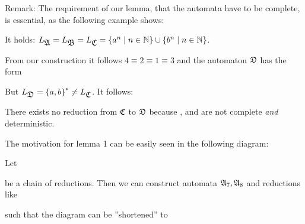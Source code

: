 Remark: The requirement of our lemma, that the automata have to be complete, is
essential, as the following example shows:

\begin{center}

\end{center}

It holds: $L_{\mbox{$\mathfrak{A}$}} = L_{\mbox{$\mathfrak{B}$}} = L_{\mbox{$\mathfrak{C}$}} = \mbox{$\{a^n \mid n \in \mathbb{N}\}$}
\cup \mbox{$\{b^n \mid n \in \mathbb{N}\}$}$.

From our construction it follows $4 \equiv 2 \equiv 1 \equiv 3$ and the
automaton $\mbox{$\mathfrak{D}$}$ has the form

\begin{center}

\end{center}

But $L_{\mbox{$\mathfrak{D}$}} = \mbox{$\{a, b\}$}^* \neq L_{\mbox{$\mathfrak{C}$}}$. It follows:

There exists no reduction from $\mbox{$\mathfrak{C}$}$ to $\mbox{$\mathfrak{D}$}$ because ,  and
 are not complete {\it and} deterministic.

\bigskip
The motivation for lemma 1 can be easily seen in the following diagram:

Let

\begin{center}
\end{center}

be a chain of reductions. Then we can construct automata $\mbox{$\mathfrak{A}$}_7, \mbox{$\mathfrak{A}$}_8$
and reductions like

\begin{center}
\end{center}

such that the diagram can be ''shortened'' to

\begin{center}
\end{center}

